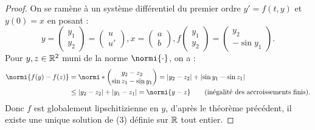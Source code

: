 \begin{proof}
On se ramène à un système différentiel du premier ordre $y'=f(t,y)$ et $y(0)=x$ en posant :
\[ y = \begin{pmatrix}y_1 \\ y_2 \end{pmatrix} = \begin{pmatrix} u \\ u' \end{pmatrix}, x = \begin{pmatrix}a \\ b \end{pmatrix}, 
f \begin{pmatrix}y_1 \\ y_2 \end{pmatrix} = \begin{pmatrix}y_2 \\ -\sin{y_1} \end{pmatrix} . \]
Pour $y, z \in \mathbb{R}^2$ muni de la norme $\normi{\cdot}$, on a :
\begin{align*}
\normi{f(y)-f(z)} & = \normi*{\begin{pmatrix} y_2-z_2 \\ \sin{z_1} - \sin{y_1} \end{pmatrix} } = \abs{y_2-z_2} + \abs{\sin{y_1} - \sin{z_1}} \\
& \leq  \abs{y_2-z_2} +  \abs{y_1-z_1} = \normi{y-z} \qquad \text{(inégalité des accroissements finis)} . 
\end{align*}
Donc $f$ est globalement lipschitizienne en $y$, d'après le théorème précédent, 
il existe une unique solution de (3) définie sur $\mathbb{R}$ tout entier.
\end{proof}

